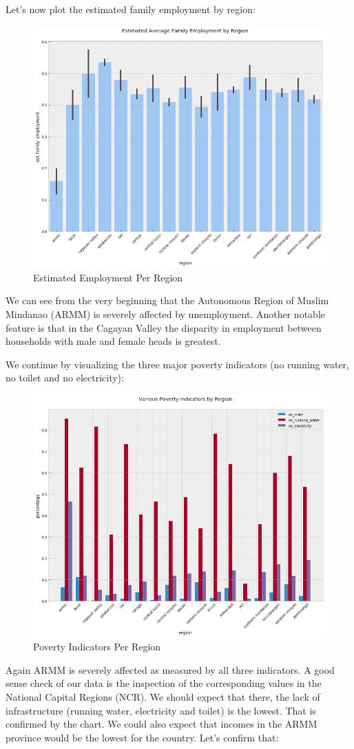 \documentclass{article}
\begin{document}
Let's now plot the estimated family employment by region:

\begin{figure}[H]
\caption{Estimated Employment Per Region}
\centering
\includegraphics[width = 0.7 \textwidth]{empl_region}
\end{figure}

We can see from the very beginning that the Autonomous Region of Muslim Mindanao (ARMM) is severely affected by unemployment. Another notable feature is that in the Cagayan Valley the disparity in employment between households with male and female heads is greatest.

We continue by visualizing the three major poverty indicators (no running water, no toilet and no electricity):

\begin{figure}[H]
\caption{Poverty Indicators Per Region}
\centering
\includegraphics[width = 0.7 \textwidth]{poverty_indicators_region}
\end{figure}

Again ARMM is severely affected as measured by all three indicators. A good sense check of our data is the inspection of the corresponding values in the National Capital Regions (NCR). We should expect that there, the lack of infrastructure (running water, electricity and toilet) is the lowest. That is confirmed by the chart. We could also expect that incomes in the ARMM province would be the lowest for the country. Let's confirm that:
\end{document}
